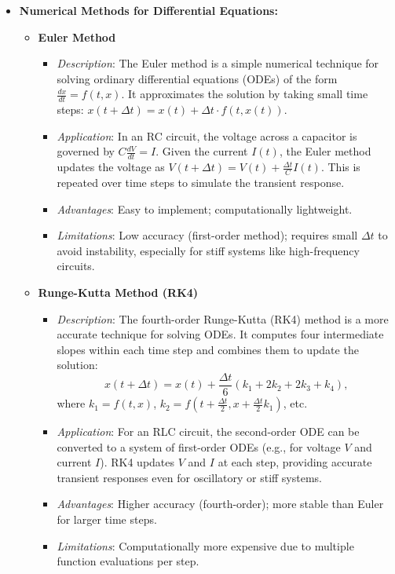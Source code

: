 \documentclass{article}
\begin{document}
\begin{itemize}
    \item \textbf{Numerical Methods for Differential Equations:}
    \begin{itemize}
        \item \textbf{Euler Method}
        \begin{itemize}
            \item \textit{Description}: The Euler method is a simple numerical technique for solving ordinary differential equations (ODEs) of the form \( \frac{dx}{dt} = f(t, x) \). It approximates the solution by taking small time steps: \( x(t + \Delta t) = x(t) + \Delta t \cdot f(t, x(t)) \).
            \item \textit{Application}: In an RC circuit, the voltage across a capacitor is governed by \( C \frac{dV}{dt} = I \). Given the current \( I(t) \), the Euler method updates the voltage as \( V(t + \Delta t) = V(t) + \frac{\Delta t}{C} I(t) \). This is repeated over time steps to simulate the transient response.
            \item \textit{Advantages}: Easy to implement; computationally lightweight.
            \item \textit{Limitations}: Low accuracy (first-order method); requires small \( \Delta t \) to avoid instability, especially for stiff systems like high-frequency circuits.
        \end{itemize}

        \item \textbf{Runge-Kutta Method (RK4)}
        \begin{itemize}
            \item \textit{Description}: The fourth-order Runge-Kutta (RK4) method is a more accurate technique for solving ODEs. It computes four intermediate slopes within each time step and combines them to update the solution: 
            \[
            x(t + \Delta t) = x(t) + \frac{\Delta t}{6} (k_1 + 2k_2 + 2k_3 + k_4),
            \]
            where \( k_1 = f(t, x) \), \( k_2 = f(t + \frac{\Delta t}{2}, x + \frac{\Delta t}{2} k_1) \), etc.
            \item \textit{Application}: For an RLC circuit, the second-order ODE can be converted to a system of first-order ODEs (e.g., for voltage \( V \) and current \( I \)). RK4 updates \( V \) and \( I \) at each step, providing accurate transient responses even for oscillatory or stiff systems.
            \item \textit{Advantages}: Higher accuracy (fourth-order); more stable than Euler for larger time steps.
            \item \textit{Limitations}: Computationally more expensive due to multiple function evaluations per step.
        \end{itemize}
    \end{itemize}
\end{itemize}
\end{document}
